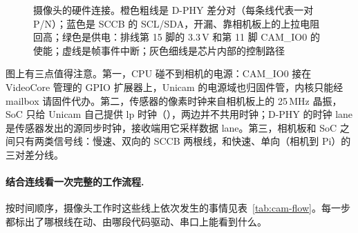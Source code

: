 \begin{figure}[htbp]
  \caption{摄像头的硬件连接。橙色粗线是 D-PHY 差分对（每条线代表一对 P/N）；蓝色是 SCCB 的 SCL/SDA，开漏、靠相机板上的上拉电阻回高；绿色是供电：排线第 15 脚的 3.3\,V 和第 11 脚 CAM\_IO0 的使能；虚线是帧事件中断；灰色细线是芯片内部的控制路径}
  \label{fig:cam-wiring}
\end{figure}

图上有三点值得注意。第一，CPU 碰不到相机的电源：CAM\_IO0 接在 VideoCore 管理的 GPIO 扩展器上，Unicam 的电源域也归固件管，内核只能经 mailbox 请固件代办。第二，传感器的像素时钟来自相机板上的 25\,MHz 晶振，SoC 只给 Unicam 自己提供 lp 时钟（），两边并不共用时钟；D-PHY 的时钟 lane 是传感器发出的源同步时钟，接收端用它采样数据 lane。第三，相机板和 SoC 之间只有两类信号线：慢速、双向的 SCCB 两根线，和快速、单向（相机到 Pi）的三对差分线。

\paragraph{结合连线看一次完整的工作流程.} 按时间顺序，摄像头工作时这些线上依次发生的事情见表~\ref{tab:cam-flow}。每一步都标出了哪根线在动、由哪段代码驱动、串口上能看到什么。

